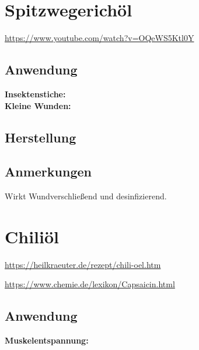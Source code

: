 \newpage




\section{Spitzwegerichöl}


\cite{swrhandwerkskunst} 

\url{https://www.youtube.com/watch?v=OQeWS5Ktl0Y}

 

\subsection{Anwendung}
\textbf{Insektenstiche:} \\ 

\textbf{Kleine Wunden:} \\

\subsection{Herstellung}
\subsection{Anmerkungen}

Wirkt Wundverschließend und desinfizierend.




\newpage



\section{Chiliöl}


\url{https://heilkraeuter.de/rezept/chili-oel.htm}

\url{https://www.chemie.de/lexikon/Capsaicin.html}

                 

\subsection{Anwendung}
\textbf{Muskelentspannung:}

